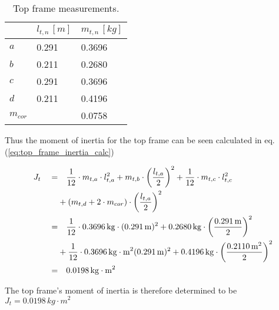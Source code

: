 \documentclass[../../main]{subfiles}
\begin{document}
\begin{table}[H]
\centering
\begin{tabular}{|l|l|l|}
\hline
  & $l_{t,n} \, \si{[m]}$ & $m_{t,n} \, \si{[kg]}$ \\
\hline
$a$ & 0.291  & 0.3696  \\
\hline
$b$ & 0.211  & 0.2680  \\
\hline
$c$ & 0.291 & 0.3696  \\
\hline
$d$ & 0.211 & 0.4196  \\
\hline
$m_{cor}$ & & 0.0758 \\
\hline
\end{tabular}
\caption{Top frame measurements.}
    \label{tab:Top_frame_table}
\end{table}

Thus the moment of inertia for the top frame can be seen calculated in eq. (\ref{eq:top_frame_inertia_calc})

\begin{equation}
  \centering
    \label{eq:top_frame_inertia_calc}
  \begin{split}
      J_t  \quad  =&  \quad \frac{1}{12} \cdot m_{t,a} \cdot l_{t,a}^2 + m_{t,b} \cdot \left(\frac{l_{t,a}}{2}\right)^2 + \frac{1}{12} \cdot m_{t,c}\cdot l_{t,c}^2\\
      &+ (m_{t,d} + 2 \cdot m_{cor}) \cdot \left( \frac{l_{t,a}}{2}\right)^2 \\
      =& \quad \frac{1}{12} \cdot 0.3696 \si{\,kg}  \cdot (0.291 \si{\,m})^2
      + 0.2680 \si{\,kg} \cdot \left(\frac{0.291 \si{\,m}}{2}\right)^2 \\
      &+ \frac{1}{12} \cdot 0.3696 \si{\,kg\cdot m^2} (0.291 \si{\,m})^2
      + 0.4196 \si{\,kg} \cdot \left( \frac{0.2110\si{\,m}^2}{2} \right)^2 \\
      =& \quad 0.0198 \si{\,kg\cdot m^2}
  \end{split}
\end{equation}

The top frame's moment of inertia is therefore determined to be
\newline $J_{t} = 0.0198 \si{\,kg\cdot m^2}$
\end{document}

